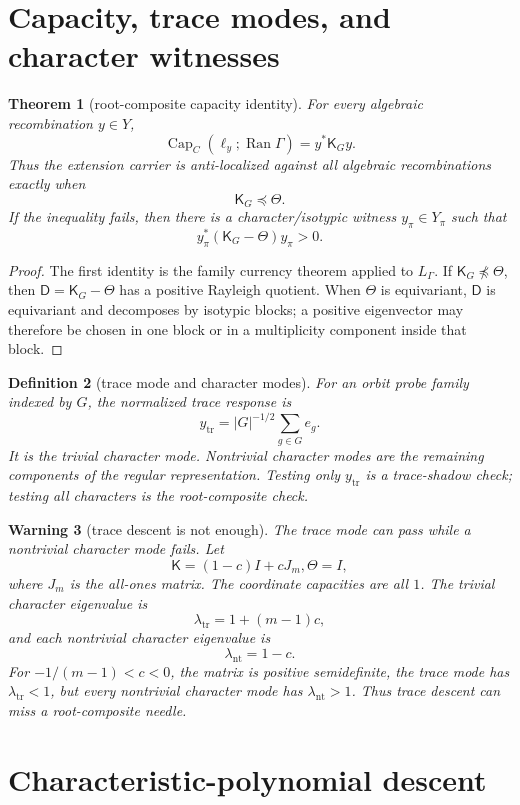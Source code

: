 \documentclass[11pt]{article}
\newtheorem{theorem}{Theorem}[section]
\newtheorem{definition}[theorem]{Definition}
\newtheorem{warning}[theorem]{Warning}
\providecommand{\Cap}{\operatorname{Cap}}
\newcommand{\Ran}{\operatorname{Ran}}
\newcommand{\K}{\mathsf K}
\newcommand{\D}{\mathsf D}
\begin{document}
\section{Capacity, trace modes, and character witnesses}

\begin{theorem}[root-composite capacity identity]
For every algebraic recombination $y\in Y$,
\[
  \Cap_C(\ell_y;\Ran\Gamma)=y^*\K_Gy.
\]
Thus the extension carrier is anti-localized against all algebraic recombinations exactly when
\[
  \K_G\preceq\Theta.
\]
If the inequality fails, then there is a character/isotypic witness $y_\pi\in Y_\pi$ such that
\[
  y_\pi^*(\K_G-\Theta)y_\pi>0.
\]
\end{theorem}

\begin{proof}
The first identity is the family currency theorem applied to $L_\Gamma$.  If $\K_G\npreceq\Theta$, then $\D=\K_G-\Theta$ has a positive Rayleigh quotient.  When $\Theta$ is equivariant, $\D$ is equivariant and decomposes by isotypic blocks; a positive eigenvector may therefore be chosen in one block or in a multiplicity component inside that block.
\end{proof}

\begin{definition}[trace mode and character modes]
For an orbit probe family indexed by $G$, the normalized trace response is
\[
  y_{\mathrm{tr}}=|G|^{-1/2}\sum_{g\in G}e_g.
\]
It is the trivial character mode.  Nontrivial character modes are the remaining components of the regular representation.  Testing only $y_{\mathrm{tr}}$ is a trace-shadow check; testing all characters is the root-composite check.
\end{definition}

\begin{warning}[trace descent is not enough]
The trace mode can pass while a nontrivial character mode fails.  Let
\[
  \K=(1-c)I+cJ_m,
  \Theta=I,
\]
where $J_m$ is the all-ones matrix.  The coordinate capacities are all $1$.  The trivial character eigenvalue is
\[
  \lambda_{\mathrm{tr}}=1+(m-1)c,
\]
and each nontrivial character eigenvalue is
\[
  \lambda_{\mathrm{nt}}=1-c.
\]
For $-1/(m-1)<c<0$, the matrix is positive semidefinite, the trace mode has $\lambda_{\mathrm{tr}}<1$, but every nontrivial character mode has $\lambda_{\mathrm{nt}}>1$.  Thus trace descent can miss a root-composite needle.
\end{warning}

\section{Characteristic-polynomial descent}
\end{document}
